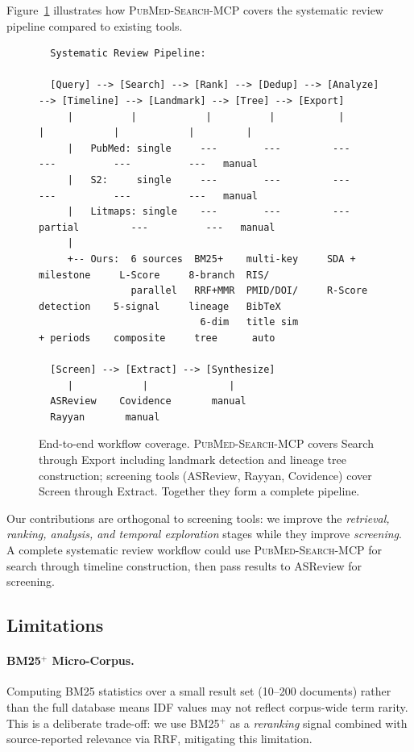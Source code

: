 \documentclass[11pt,a4paper]{article}
\newcommand{\system}{\textsc{PubMed-Search-MCP}}
\begin{document}
Figure~\ref{fig:workflow} illustrates how \system{} covers the systematic review pipeline compared to existing tools.

\begin{figure}[htbp]
\centering
\small
\begin{verbatim}
  Systematic Review Pipeline:

  [Query] --> [Search] --> [Rank] --> [Dedup] --> [Analyze] --> [Timeline] --> [Landmark] --> [Tree] --> [Export]
     |          |            |          |           |             |            |            |         |
     |   PubMed: single     ---        ---         ---           ---          ---          ---   manual
     |   S2:     single     ---        ---         ---           ---          ---          ---   manual
     |   Litmaps: single    ---        ---         ---        partial         ---          ---   manual
     |
     +-- Ours:  6 sources  BM25+    multi-key     SDA +      milestone     L-Score     8-branch  RIS/
                parallel   RRF+MMR  PMID/DOI/     R-Score    detection    5-signal     lineage   BibTeX
                            6-dim   title sim               + periods    composite     tree      auto

  [Screen] --> [Extract] --> [Synthesize]
     |            |              |
  ASReview    Covidence       manual
  Rayyan       manual
\end{verbatim}
\caption{End-to-end workflow coverage. \system{} covers Search through Export including landmark detection and lineage tree construction; screening tools (ASReview, Rayyan, Covidence) cover Screen through Extract. Together they form a complete pipeline.}
\label{fig:workflow}
\end{figure}

Our contributions are orthogonal to screening tools: we improve the \emph{retrieval, ranking, analysis, and temporal exploration} stages while they improve \emph{screening}.
A complete systematic review workflow could use \system{} for search through timeline construction, then pass results to ASReview for screening.

\subsection{Limitations}

\paragraph{BM25$^{+}$ Micro-Corpus.}
Computing BM25 statistics over a small result set (10--200 documents) rather than the full database means IDF values may not reflect corpus-wide term rarity.
This is a deliberate trade-off: we use BM25$^{+}$ as a \emph{reranking} signal combined with source-reported relevance via RRF, mitigating this limitation.
\end{document}

